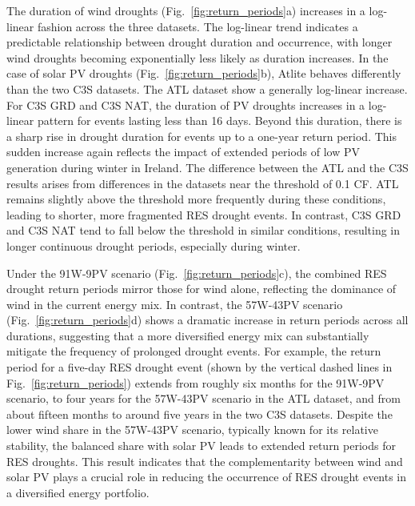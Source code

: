 \documentclass[preprint, 12pt]{elsarticle}
\begin{document}
The duration of wind droughts (Fig.~\ref{fig:return_periods}a) increases in a log-linear fashion across the three datasets. The log-linear trend indicates a predictable relationship between drought duration and occurrence, with longer wind droughts becoming exponentially less likely as duration increases. In the case of solar PV droughts (Fig.~\ref{fig:return_periods}b), Atlite behaves differently than the two C3S datasets. The ATL dataset show a generally log-linear increase. For C3S GRD and C3S NAT, the duration of PV droughts increases in a log-linear pattern for events lasting less than 16 days. Beyond this duration, there is a sharp rise in drought duration for events up to a one-year return period. This sudden increase again reflects the impact of extended periods of low PV generation during winter in Ireland. The difference between the ATL and the C3S results arises from differences in the datasets near the threshold of 0.1 CF. ATL remains slightly above the threshold more frequently during these conditions, leading to shorter, more fragmented RES drought events. In contrast, C3S GRD and C3S NAT tend to fall below the threshold in similar conditions, resulting in longer continuous drought periods, especially during winter.

Under the 91W-9PV scenario (Fig.~\ref{fig:return_periods}c), the combined RES drought return periods mirror those for wind alone, reflecting the dominance of wind in the current energy mix. In contrast, the 57W-43PV scenario (Fig.~\ref{fig:return_periods}d) shows a dramatic increase in return periods across all durations, suggesting that a more diversified energy mix can substantially mitigate the frequency of prolonged drought events. For example, the return period for a five-day RES drought event (shown by the vertical dashed lines in Fig.~\ref{fig:return_periods}) extends from roughly six months for the 91W-9PV scenario, to four years for the 57W-43PV scenario in the ATL dataset, and from about fifteen months to around five years in the two C3S datasets. Despite the lower wind share in the 57W-43PV scenario, typically known for its relative stability, the balanced share with solar PV leads to extended return periods for RES droughts. This result indicates that the complementarity between wind and solar PV plays a crucial role in reducing the occurrence of RES drought events in a diversified energy portfolio.
\end{document}
